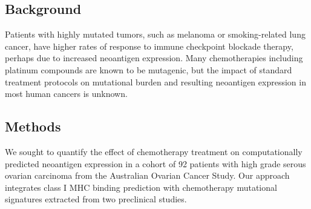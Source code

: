 \subsection*{Background}
Patients with highly mutated tumors, such as melanoma or smoking-related lung cancer, have higher rates of response to immune checkpoint blockade therapy, perhaps due to increased neoantigen expression. Many chemotherapies including platinum compounds are known to be mutagenic, but the impact of standard treatment protocols on mutational burden and resulting neoantigen expression in most human cancers is unknown.


\subsection*{Methods}

We sought to quantify the effect of chemotherapy treatment on computationally predicted neoantigen expression in a cohort of 92 patients with high grade serous ovarian carcinoma from the Australian Ovarian Cancer Study. Our approach integrates class I MHC binding prediction with chemotherapy mutational signatures extracted from two preclinical studies.




